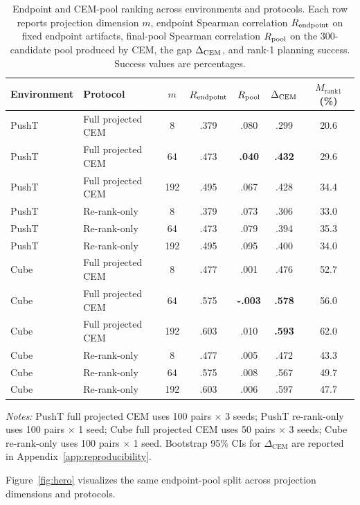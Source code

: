 \begin{table}[t]
\centering
\small
\begin{tabular}{llccccc}
\toprule
Environment & Protocol & $m$ & $R_\text{endpoint}$ & $R_\text{pool}$ & $\Delta_\text{CEM}$ & $M_\mathrm{rank1}$ (\%) \\
\midrule
PushT & Full projected CEM & 8 & .379 & .080 & .299 & 20.6 \\
PushT & Full projected CEM & 64 & .473 & \textbf{.040} & \textbf{.432} & 29.6 \\
PushT & Full projected CEM & 192 & .495 & .067 & .428 & 34.4 \\
PushT & Re-rank-only & 8 & .379 & .073 & .306 & 33.0 \\
PushT & Re-rank-only & 64 & .473 & .079 & .394 & 35.3 \\
PushT & Re-rank-only & 192 & .495 & .095 & .400 & 34.0 \\
\midrule
Cube & Full projected CEM & 8 & .477 & .001 & .476 & 52.7 \\
Cube & Full projected CEM & 64 & .575 & \textbf{-.003} & \textbf{.578} & 56.0 \\
Cube & Full projected CEM & 192 & .603 & .010 & \textbf{.593} & 62.0 \\
Cube & Re-rank-only & 8 & .477 & .005 & .472 & 43.3 \\
Cube & Re-rank-only & 64 & .575 & .008 & .567 & 49.7 \\
Cube & Re-rank-only & 192 & .603 & .006 & .597 & 47.7 \\
\bottomrule
\end{tabular}
\caption{Endpoint and CEM-pool ranking across environments and protocols. Each row reports projection dimension $m$, endpoint Spearman correlation $R_\text{endpoint}$ on fixed endpoint artifacts, final-pool Spearman correlation $R_\text{pool}$ on the 300-candidate pool produced by CEM, the gap $\Delta_\text{CEM}$, and rank-1 planning success. Success values are percentages.}
\label{tab:cem-gap-protocols}
\smallskip
\begin{minipage}{0.98\linewidth}
\scriptsize
\textit{Notes:} PushT full projected CEM uses 100 pairs $\times$ 3 seeds; PushT re-rank-only uses 100 pairs $\times$ 1 seed; Cube full projected CEM uses 50 pairs $\times$ 3 seeds; Cube re-rank-only uses 100 pairs $\times$ 1 seed. Bootstrap 95\% CIs for $\Delta_{\text{CEM}}$ are reported in Appendix~\ref{app:reproducibility}.
\end{minipage}
\end{table}

Figure~\ref{fig:hero} visualizes the same endpoint-pool split across projection dimensions and protocols.

